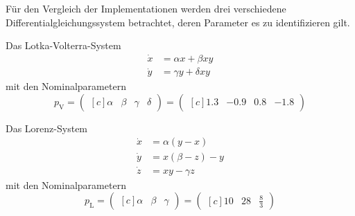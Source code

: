 Für den Vergleich der Implementationen werden drei verschiedene Differentialgleichungssystem betrachtet, deren Parameter es zu identifizieren gilt.

Das Lotka-Volterra-System
\begin{equation}
\begin{aligned}
\dot{x} &= \alpha x +\beta xy\\
\dot{y} &= \gamma y + \delta xy 
\end{aligned}
\end{equation}
mit den Nominalparametern
\begin{equation}
p_\text{V}=	\begin{pmatrix*}[c]
				\alpha&\beta&\gamma&\delta
				\end{pmatrix*} = 
				\begin{pmatrix*}[c]
					1.3& -0.9& 0.8& -1.8
				\end{pmatrix*}
\end{equation}

Das Lorenz-System
\begin{equation}
\begin{aligned}
\dot{x} &= \alpha(y-x)\\
\dot{y} &= x(\beta - z) -y\\
\dot{z} &= xy-\gamma z
\end{aligned}
\end{equation}
mit den Nominalparametern
\begin{equation}
p_\text{L}=	\begin{pmatrix*}[c]
				\alpha&\beta&\gamma
				\end{pmatrix*} = 
				\begin{pmatrix*}[c]
					10& 28& \frac{8}{3}
				\end{pmatrix*}
\end{equation}


